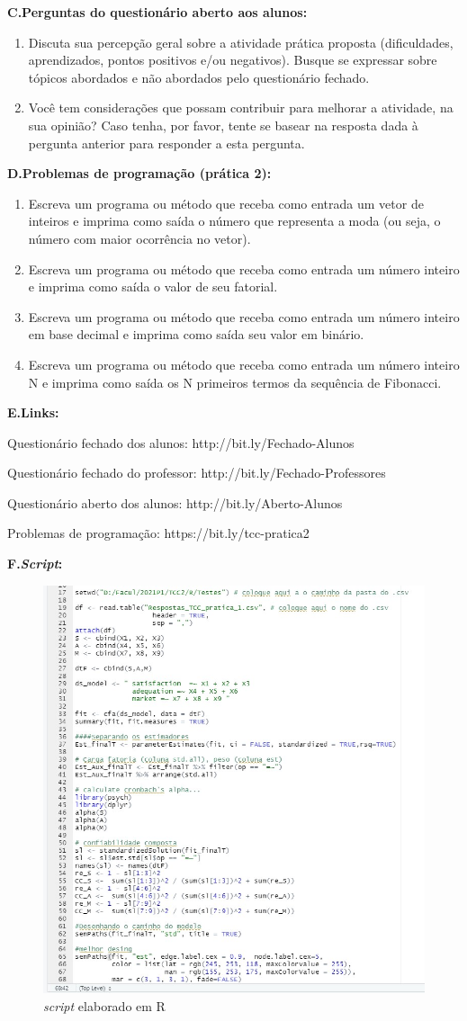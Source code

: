 \textbf{C.\quad Perguntas do questionário aberto aos alunos:}
\begin{enumerate}
    \item Discuta sua percepção geral sobre a atividade prática proposta (dificuldades, aprendizados, pontos positivos e/ou negativos). Busque se expressar sobre tópicos abordados e não abordados pelo questionário fechado.
    
    \item Você tem considerações que possam contribuir para melhorar a atividade, na sua opinião? Caso tenha, por favor, tente se basear na resposta dada à pergunta anterior para responder a esta pergunta.
\end{enumerate}
\textbf{D.\quad Problemas de programação (prática 2):}
\begin{enumerate}
\item Escreva um programa ou método que receba como entrada um vetor de inteiros e imprima como saída o número que representa a moda (ou seja, o número com maior ocorrência no vetor).

\item Escreva um programa ou método que receba como entrada um número inteiro e  imprima como saída o valor de seu fatorial.

\item Escreva um programa ou método que receba como entrada um número inteiro em base decimal e imprima como saída seu valor em binário.

\item Escreva um programa ou método que receba como entrada um número inteiro N e imprima como saída os N primeiros termos da sequência de Fibonacci.
\end{enumerate}
\textbf{E.\quad Links:}

Questionário fechado dos alunos:
http://bit.ly/Fechado-Alunos

Questionário fechado do professor:
http://bit.ly/Fechado-Professores

Questionário aberto dos alunos:
http://bit.ly/Aberto-Alunos

Problemas de programação:
https://bit.ly/tcc-pratica2

\textbf{F.\quad \textit{Script}:}
\begin{figure}
    \centering
    \includegraphics[width=12cm,height=12cm]{Imagens/script.jpg}
    \caption{\textit{script} elaborado em R}
    \label{fig:Processo}
\end{figure}

\ \
